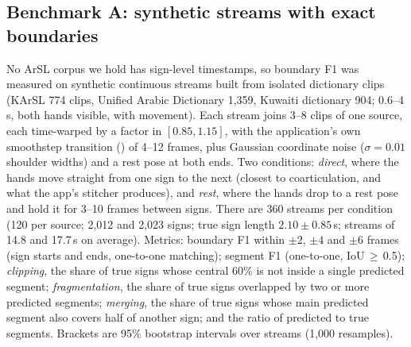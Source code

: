 \subsection{Benchmark A: synthetic streams with exact boundaries}
No ArSL corpus we hold has sign-level timestamps, so boundary F1 was measured on synthetic continuous streams built
from isolated dictionary clips (KArSL 774 clips, Unified Arabic Dictionary 1,359, Kuwaiti dictionary 904; 0.6--4\,s,
both hands visible, with movement). Each stream joins 3--8 clips of one source, each time-warped by a factor in
$[0.85, 1.15]$, with the application's own smoothstep transition () of 4--12 frames, plus
Gaussian coordinate noise ($\sigma = 0.01$ shoulder widths) and a rest pose at both ends. Two conditions:
\emph{direct}, where the hands move straight from one sign to the next (closest to coarticulation, and what the app's
stitcher produces), and \emph{rest}, where the hands drop to a rest pose and hold it for 3--10 frames between signs.
There are 360 streams per condition (120 per source; 2,012 and 2,023 signs; true sign length $2.10 \pm 0.85$\,s;
streams of 14.8 and 17.7\,s on average). Metrics: boundary F1 within $\pm2$, $\pm4$ and $\pm6$ frames (sign starts and
ends, one-to-one matching); segment F1 (one-to-one, IoU\,$\ge$\,0.5); \emph{clipping}, the share of true signs whose
central 60\% is not inside a single predicted segment; \emph{fragmentation}, the share of true signs overlapped by two
or more predicted segments; \emph{merging}, the share of true signs whose main predicted segment also covers half of
another sign; and the ratio of predicted to true segments. Brackets are 95\% bootstrap intervals over streams (1,000
resamples).

